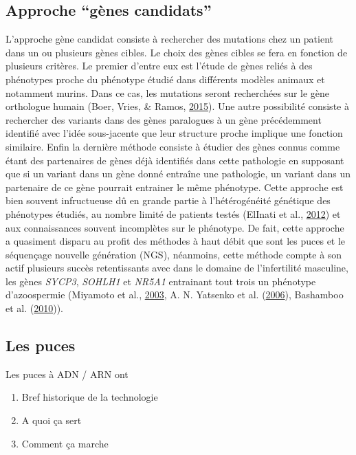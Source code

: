\documentclass[12pt,twoside]{reedthesis}
\providecommand{\tightlist}{%
  \setlength{\itemsep}{0pt}\setlength{\parskip}{0pt}}
\theoremstyle{definition}
\theoremstyle{definition}
\theoremstyle{remark}
\begin{document}
  \subsection{\texorpdfstring{Approche ``gènes
  candidats''}{Approche gènes candidats}}\label{approche-genes-candidats}
  
  L'approche gène candidat consiste à rechercher des mutations chez un
  patient dans un ou plusieurs gènes cibles. Le choix des gènes cibles se
  fera en fonction de plusieurs critères. Le premier d'entre eux est
  l'étude de gènes reliés à des phénotypes proche du phénotype étudié dans
  différents modèles animaux et notamment murins. Dans ce cas, les
  mutations seront recherchées sur le gène orthologue humain (Boer, Vries,
  \& Ramos, \protect\hyperlink{ref-DeBoer2015}{2015}). Une autre
  possibilité consiste à rechercher des variants dans des gènes paralogues
  à un gène précédemment identifié avec l'idée sous-jacente que leur
  structure proche implique une fonction similaire. Enfin la dernière
  méthode consiste à étudier des gènes connus comme étant des partenaires
  de gènes déjà identifiés dans cette pathologie en supposant que si un
  variant dans un gène donné entraîne une pathologie, un variant dans un
  partenaire de ce gène pourrait entrainer le même phénotype. Cette
  approche est bien souvent infructueuse dû en grande partie à
  l'hétérogénéité génétique des phénotypes étudiés, au nombre limité de
  patients testés (ElInati et al.,
  \protect\hyperlink{ref-ElInati2012}{2012}) et aux connaissances souvent
  incomplètes sur le phénotype. De fait, cette approche a quasiment
  disparu au profit des méthodes à haut débit que sont les puces et le
  séquençage nouvelle génération (NGS), néanmoins, cette méthode compte à
  son actif plusieurs succès retentissants avec dans le domaine de
  l'infertilité masculine, les gènes \emph{SYCP3}, \emph{SOHLH1} et
  \emph{NR5A1} entrainant tout trois un phénotype d'azoospermie (Miyamoto
  et al., \protect\hyperlink{ref-Miyamoto2003}{2003}, A. N. Yatsenko et
  al. (\protect\hyperlink{ref-Yatsenko2006}{2006}), Bashamboo et al.
  (\protect\hyperlink{ref-Bashamboo2010}{2010})).
  
  \newpage
  
  \subsection{Les puces}\label{les-puces}
  
  Les puces à ADN / ARN ont
  
  \begin{enumerate}
  \def\labelenumi{\arabic{enumi}.}
  \tightlist
  \item
    Bref historique de la technologie\\
  \item
    A quoi ça sert
  \item
    Comment ça marche
  \end{enumerate}
  
\end{document}
